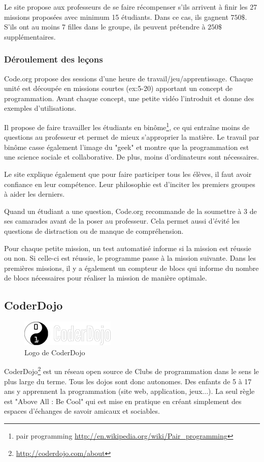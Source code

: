 Le site propose aux professeurs de se faire récompenser s'ils arrivent à finir les 27 missions proposées avec minimum 15 étudiants. Dans ce cas, ils gagnent $750\$$. S'ils ont au moins 7 filles dans le groupe, ils peuvent prétendre à $250\$$ supplémentaires.

\subsubsection{Déroulement des leçons}
Code.org propose des sessions d'une heure de travail/jeu/apprentissage. Chaque unité est découpée en missions courtes (ex:5-20) apportant un concept de programmation. Avant chaque concept, une petite vidéo l'introduit et donne des exemples d'utilisations.

Il propose de faire travailler les étudiants en binôme\footnote{pair programming \url{http://en.wikipedia.org/wiki/Pair\_programming}}, ce qui entraîne moins de questions au professeur et permet de mieux s'approprier la matière. Le travail par binôme casse également l'image du "geek" et montre que la programmation est une science sociale et collaborative. De plus, moins d'ordinateurs sont nécessaires.

Le site explique également que pour faire participer tous les élèves, il faut avoir confiance en leur compétence. Leur philosophie est d'inciter les premiers groupes à aider les derniers.

Quand un étudiant a une question, Code.org recommande de la soumettre à 3 de ses camarades avant de la poser au professeur. Cela permet aussi d'évité les questions de distraction ou de manque de compréhension.

Pour chaque petite mission, un test automatisé informe si la mission est réussie ou non. Si celle-ci est réussie, le programme passe à la mission suivante. Dans les premières missions, il y a également un compteur de blocs qui informe du nombre de blocs nécessaires pour réaliser la mission de manière optimale.

\subsection{CoderDojo}
\begin{figure}[!h]
  \begin{center}
    \includegraphics[scale=0.5]{content/5-related_work/images/dojo}
    \caption{Logo de CoderDojo}
    \label{fig:coder dojo}
  \end{center}
\end{figure}
CoderDojo\footnote{\url{http://coderdojo.com/about}} est un réseau open source de Clubs de programmation dans le sens le plus large du terme. Tous les dojos sont donc autonomes. Des enfants de 5 à 17 ans y apprennent la programmation (site web, application, jeux...). La seul règle est "Above All : Be Cool" qui est mise en pratique en créant simplement des espaces d'échanges de savoir amicaux et sociables.

